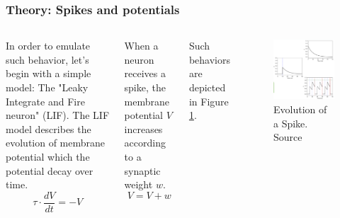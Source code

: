 \begin{frame}[allowframebreaks]
	\frametitle{Theory: Spikes and potentials}
	
	\begin{columns}
			\par In order to emulate such behavior, let's begin with a simple model: The "Leaky Integrate and Fire neuron" (LIF). The LIF model describes the evolution of membrane potential which the potential decay over time.
			\begin{equation}
				\tau \cdot \frac{dV}{dt} = -V
				\label{eq:leak}
			\end{equation}
			
			\par When a neuron receives a spike, the membrane potential $V$ increases according to a synaptic weight $w$.
			\begin{equation}
				V = V + w
			\end{equation}
			
			\par Such behaviors are depicted in Figure \ref{fig:neuronspikes2}.
			\begin{figure}
				\centering
				\includegraphics[width=.87\linewidth]{images/neuronSpikes2}
				\caption{Evolution of a Spike. Source \cite{dan_goodman_2022_7044500}}
				\label{fig:neuronspikes2}
			\end{figure}
	\end{columns}


\end{frame}
